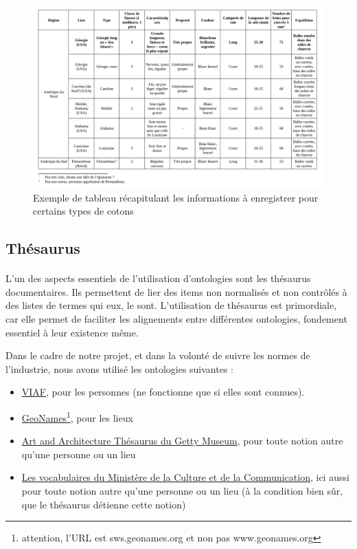 \begin{figure} [H]
    \centering
    \includegraphics[width=1\textwidth]{assets/divers/screen_cotons.png}
    \caption{Exemple de tableau récapitulant les informations à enregistrer pour certains types de cotons}
    \label{fig:screenTableauCoton}
\end{figure}

\subsection{Thésaurus}

\paragraph{} \hspace{10mm}
L'un des aspects essentiels de l'utilisation d'ontologies sont les thésaurus documentaires. Ils permettent de lier des items non normalisés et non contrôlés à des listes de termes qui eux, le sont. L'utilisation de thésaurus est primordiale, car elle permet de faciliter les alignements entre différentes ontologies, fondement essentiel à leur existence même.

Dans le cadre de notre projet, et dans la volonté de suivre les normes de l'industrie, nous avons utilisé les ontologies suivantes :
\begin{itemize}
    \item[\ding{103}] \href{https://viaf.org/}{VIAF}, pour les personnes (ne fonctionne que si elles sont connues).
    \item[\ding{103}] \href{https://sws.geonames.org/}{GeoNames}\footnote{attention, l'URL est sws.geonames.org et non pas www.geonames.org}, pour les lieux
    \item[\ding{103}] \href{https://www.getty.edu/research/tools/vocabularies/aat}{Art and Architecture Thésaurus du Getty Museum}, pour toute notion autre qu'une personne ou un lieu
    \item[\ding{103}] \href{http://data.culture.fr/thesaurus/}{Les vocabulaires du Ministère de la Culture et de la Communication}, ici aussi pour toute notion autre qu'une personne ou un lieu (à la condition bien sûr, que le thésaurus détienne cette notion)
\end{itemize}

